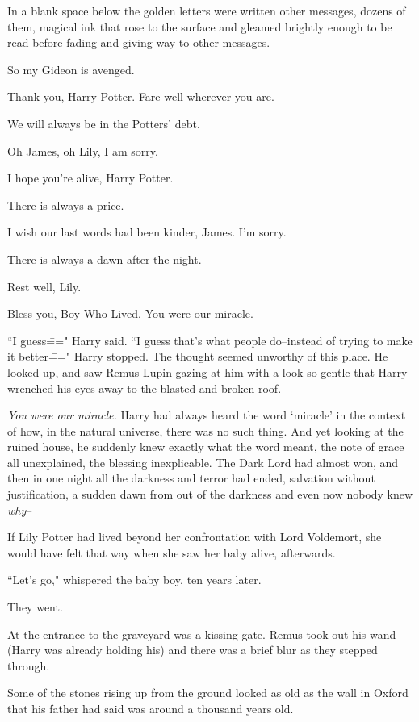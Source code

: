 In a blank space below the golden letters were written other messages, dozens of them, magical ink that rose to the surface and gleamed brightly enough to be read before fading and giving way to other messages.

\begin{center}
So my Gideon is avenged.

Thank you, Harry Potter. Fare well wherever you are.

We will always be in the Potters' debt.

Oh James, oh Lily, I am sorry.

I hope you're alive, Harry Potter.

There is always a price.

I wish our last words had been kinder, James. I'm sorry.

There is always a dawn after the night.

Rest well, Lily.

Bless you, Boy-Who-Lived. You were our miracle.
\end{center}

``I guess\===" Harry said. ``I guess that's what people do\---instead of trying to make it better\===" Harry stopped. The thought seemed unworthy of this place. He looked up, and saw Remus Lupin gazing at him with a look so gentle that Harry wrenched his eyes away to the blasted and broken roof.

\emph{You were our miracle.} Harry had always heard the word `miracle' in the context of how, in the natural universe, there was no such thing. And yet looking at the ruined house, he suddenly knew exactly what the word meant, the note of grace all unexplained, the blessing inexplicable. The Dark Lord had almost won, and then in one night all the darkness and terror had ended, salvation without justification, a sudden dawn from out of the darkness and even now nobody knew \emph{why}\---

If Lily Potter had lived beyond her confrontation with Lord Voldemort, she would have felt that way when she saw her baby alive, afterwards.

``Let's go," whispered the baby boy, ten years later.

They went.

At the entrance to the graveyard was a kissing gate. Remus took out his wand (Harry was already holding his) and there was a brief blur as they stepped through.

Some of the stones rising up from the ground looked as old as the wall in Oxford that his father had said was around a thousand years old.


